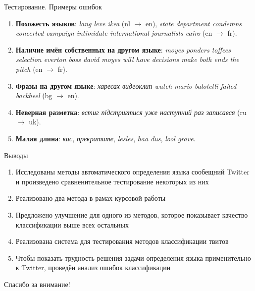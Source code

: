 \documentclass[mathserif,utf8,14pt]{beamer}
\begin{document}
\begin{frame}{Тестирование. Примеры ошибок}
    
            \begin{enumerate}
                \item \textbf{Похожесть языков}: \textit{lang leve ikea} (nl $\to$ en), 
                            \textit{state department condemns concerted campaign intimidate international journalists cairo} (en $\to$ fr).
                    \item \textbf{Наличие имён собственных на другом языке}:
                            \textit{moyes ponders toffees selection everton boss david moyes will have decisions make both ends the pitch} (en $\to$ fr).
                        \item \textbf{Фразы на другом языке}:
                            \textit{харесах видеоклип watch mario balotelli failed backheel} (bg $\to$ en).
                        \item \textbf{Неверная разметка}: 
                            \textit{встиг підстригтися уже наступний раз записався} (ru $\to$ uk). 
                        \item \textbf{Малая длина}:
                            \textit{кис}, \textit{прекратите}, \textit{lesles}, \textit{haa dus}, \textit{lool grave}. 
            \end{enumerate}
\end{frame}

\begin{frame}{Выводы}
    \begin{enumerate}
        \item Исследованы методы автоматического определения языка сообещний Twitter и произведено сравненительное тестирование некоторых из них
        \item Реализовано два метода в рамах курсовой работы
        \item Предложено улучшение для одного из методов, которое показывает качество классификации выше всех остальных
        \item Реализована система для тестирования методов классификации твитов
        \item Чтобы показать трудность решения задачи определения языка применительно к Twitter, проведён анализ ошибок классификации
    \end{enumerate}
\end{frame}


\begin{frame}{}
    \begin{center}
    \large Спасибо за внимание!
    \end{center}
\end{frame}
\end{document}
